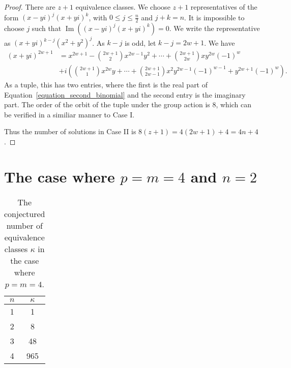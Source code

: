 \documentclass[12pt]{article}
\theoremstyle{definition}
\theoremstyle{remark}
\numberwithin{equation}{section}
\DeclareMathOperator{\Imag}{Im}
\begin{document}
\begin{proof}
There are \( z + 1 \) equivalence classes. We choose \( z + 1 \)
representatives of the form \( (x - yi)^j (x + yi)^k \), with
\( 0 \leq j \leq \frac{n}{2}\) and \( j + k = n \).
It is impossible to
choose \( j \) such that \( \Imag\left( (x - yi)^j (x + yi)^k \right) = 0\).
We write the representative as \( (x + yi)^{k-j} (x^2 + y^2)^j \).
As \( k - j \) is odd, let \( k - j = 2w + 1 \). We have
\begin{align}
\label{equation_second_binomial}
(x + yi) ^ {2w + 1} &= x ^ {2w + 1} - \binom{2w+1}{2}  x^{2w - 1 } y^2
+ \cdots + \binom{2w+1}{2w} x y^{2w} (-1) ^ {w} \nonumber
\\
&+ i \left( \binom{2w+1}{1} x ^ {2w} y + \cdots +
\binom{2w+1}{2w-1}  x^2 y ^ {2w -1} (-1)^{w-1}
+  y^{2w+1} (-1) ^ {w}
\right).
\end{align}
As a tuple, this has two entries, where the first is the real part
of Equation~\ref{equation_second_binomial} and the second entry
is the imaginary part.
The order of the orbit of the tuple under the group action is 8, which can be
verified in a similiar manner to Case I.

Thus the number of solutions in Case II is \( 8(z + 1) = 4 ( 2w + 1) + 4 = 4n + 4 \).
\end{proof}




\section{The case where \(p = m = 4\) and \(n = 2\)}





\begin{table}[h]

\label{table:4D}


\begin{center}


\begin{tabular}{ c | c }
 \( n \) & \( \kappa \) \\
\hline\hline
 1 & 1 \\
\hline
 2 & 8 \\
\hline
 3 & 48 \\
\hline
 4 & 965 
\end{tabular}





\end{center}
\caption{
The conjectured number of equivalence
classes \( \kappa \)  
in the case where \(p = m = 4\).
 }

\end{table}
\end{document}
